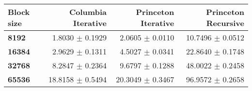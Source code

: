 \begin{tabular}{lrrr}\toprule
\textbf{Block size}  & \textbf{Columbia Iterative} & \textbf{Princeton Iterative} & \textbf{Princeton Recursive}\\\midrule
\textbf{8192}  & 1.8030 $\pm$ 0.1929 & 2.0605 $\pm$ 0.0110 & 10.7496 $\pm$ 0.0512\\
\textbf{16384}  & 2.9629 $\pm$ 0.1311 & 4.5027 $\pm$ 0.0341 & 22.8640 $\pm$ 0.1748\\
\textbf{32768}  & 8.2847 $\pm$ 0.2364 & 9.6797 $\pm$ 0.1288 & 48.0022 $\pm$ 0.2458\\
\textbf{65536} & 18.8158 $\pm$ 0.5494 & 20.3049 $\pm$ 0.3467 & 96.9572 $\pm$ 0.2658\\
\bottomrule
\end{tabular}
